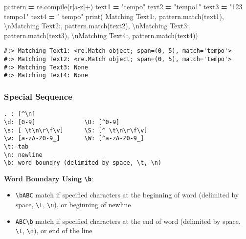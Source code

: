 \documentclass[
]{book}
\newenvironment{Shaded}{\begin{snugshade}}{\end{snugshade}}
\newcommand{\BuiltInTok}[1]{#1}
\newcommand{\CharTok}[1]{\textcolor[rgb]{0.5,0.5,0.5}{#1}}
\newcommand{\NormalTok}[1]{#1}
\newcommand{\OperatorTok}[1]{\textcolor[rgb]{0.43,0.43,0.43}{\textbf{#1}}}
\newcommand{\StringTok}[1]{\textcolor[rgb]{0.5,0.5,0.5}{#1}}
\newcommand{\VerbatimStringTok}[1]{\textcolor[rgb]{0.5,0.5,0.5}{#1}}
\providecommand{\tightlist}{%
  \setlength{\itemsep}{0pt}\setlength{\parskip}{0pt}}
\begin{document}
\begin{Shaded}
\begin{Highlighting}[]
\NormalTok{pattern }\OperatorTok{=}\NormalTok{ re.}\BuiltInTok{compile}\NormalTok{(}\VerbatimStringTok{r\textquotesingle{}[a{-}z]+\textquotesingle{}}\NormalTok{)}
\NormalTok{text1 }\OperatorTok{=} \StringTok{"tempo"}
\NormalTok{text2 }\OperatorTok{=} \StringTok{"tempo1"}
\NormalTok{text3 }\OperatorTok{=} \StringTok{"123 tempo1"}
\NormalTok{text4 }\OperatorTok{=} \StringTok{" tempo"}
\BuiltInTok{print}\NormalTok{(}
  \StringTok{\textquotesingle{}Matching Text1:\textquotesingle{}}\NormalTok{, pattern.match(text1),}
  \StringTok{\textquotesingle{}}\CharTok{\textbackslash{}n}\StringTok{Matching Text2:\textquotesingle{}}\NormalTok{, pattern.match(text2),}
  \StringTok{\textquotesingle{}}\CharTok{\textbackslash{}n}\StringTok{Matching Text3:\textquotesingle{}}\NormalTok{, pattern.match(text3),}
  \StringTok{\textquotesingle{}}\CharTok{\textbackslash{}n}\StringTok{Matching Text4:\textquotesingle{}}\NormalTok{, pattern.match(text4))}
\end{Highlighting}
\end{Shaded}

\begin{verbatim}
#:> Matching Text1: <re.Match object; span=(0, 5), match='tempo'> 
#:> Matching Text2: <re.Match object; span=(0, 5), match='tempo'> 
#:> Matching Text3: None 
#:> Matching Text4: None
\end{verbatim}

\hypertarget{special-sequence}{%
\subsubsection{Special Sequence}\label{special-sequence}}

\begin{verbatim}
. : [^\n]
\d: [0-9]              \D: [^0-9]
\s: [ \t\n\r\f\v]      \S: [^ \t\n\r\f\v]
\w: [a-zA-Z0-9_]       \W: [^a-zA-Z0-9_]
\t: tab
\n: newline
\b: word boundry (delimited by space, \t, \n)
\end{verbatim}

\textbf{Word Boundary Using \texttt{\textbackslash{}b}}:

\begin{itemize}
\tightlist
\item
  \texttt{\textbackslash{}bABC} match if specified characters at the beginning of word (delimited by space, \texttt{\textbackslash{}t}, \texttt{\textbackslash{}n}), or beginning of newline\\
\item
  \texttt{ABC\textbackslash{}b} match if specified characters at the end of word (delimited by space, \texttt{\textbackslash{}t}, \texttt{\textbackslash{}n}), or end of the line
\end{itemize}
\end{document}
